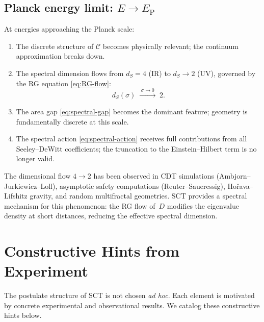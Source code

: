 \documentclass[12pt,a4paper]{article}
\theoremstyle{postulate}
\newcommand{\Dirac}{D}
\newcommand{\Causal}{\mathcal{C}}
\begin{document}
\subsection{Planck energy limit: $E \to E_{\mathrm{P}}$}

At energies approaching the Planck scale:
\begin{enumerate}[label=(\roman*)]
  \item The discrete structure of $\Causal$ becomes physically relevant; the
        continuum approximation breaks down.
  \item The spectral dimension flows from $d_S = 4$ (IR) to $d_S \to 2$
        (UV), governed by the RG equation \eqref{eq:RG-flow}:
        \begin{equation}\label{eq:dim-flow}
          d_S(\sigma) \;\xrightarrow{\;\sigma \to 0\;}\; 2.
        \end{equation}
  \item The area gap \eqref{eq:spectral-gap} becomes the dominant feature;
        geometry is fundamentally discrete at this scale.
  \item The spectral action \eqref{eq:spectral-action} receives full
        contributions from all Seeley--DeWitt coefficients; the truncation
        to the Einstein--Hilbert term is no longer valid.
\end{enumerate}

\noindent
The dimensional flow $4 \to 2$ has been observed in CDT simulations
(Ambjorn--Jurkiewicz--Loll), asymptotic safety computations (Reuter--Saueressig),
Ho\v{r}ava--Lifshitz gravity, and random multifractal geometries.  SCT provides
a spectral mechanism for this phenomenon: the RG flow of~$\Dirac$ modifies
the eigenvalue density at short distances, reducing the effective spectral
dimension.


\section{Constructive Hints from Experiment}\label{sec:hints}

The postulate structure of SCT is not chosen \textit{ad hoc}.  Each element
is motivated by concrete experimental and observational results.  We catalog
these constructive hints below.
\end{document}
